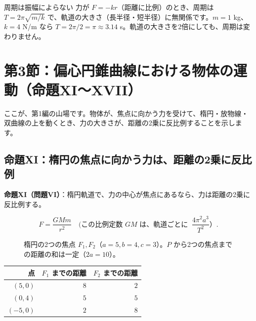 \documentclass[a4paper,11pt,openany]{ltjsbook}
\begin{document}
\begin{examplebox}{周期は振幅によらない}
力が $F=-kr$（距離に比例）のとき、周期は $T=2\pi\sqrt{m/k}$ で、軌道の大きさ（長半径・短半径）に無関係です。$m=1$ kg、$k=4$ N/m なら $T=2\pi/2=\pi\approx3.14$ s。軌道の大きさを2倍にしても、周期は変わりません。
\end{examplebox}

\section{第3節：偏心円錐曲線における物体の運動（命題XI〜XVII）}

ここが、第1編の山場です。物体が、焦点に向かう力を受けて、楕円・放物線・双曲線の上を動くとき、力の大きさが、距離の2乗に反比例することを示します。

\subsection{命題XI：楕円の焦点に向かう力は、距離の2乗に反比例}

\textbf{命題XI（問題VI）}：楕円軌道で、力の中心が焦点にあるなら、力は距離の2乗に反比例する。

\[
F=\frac{GMm}{r^2}\quad(\text{この比例定数 }GM\text{ は、軌道ごとに }\ \frac{4\pi^2a^3}{T^2}\text{）}.
\]

\begin{figure}[htbp]
\centering
{}
\caption{楕円の2つの焦点 $F_1,F_2$（$a=5,b=4,c=3$）。$P$ から2つの焦点までの距離の和は一定（$2a=10$）。}
\end{figure}

\begin{center}
\begin{tabular}{rrr}
\toprule
点 & $F_1$ までの距離 & $F_2$ までの距離\\
\midrule
$(5,0)$ & $8$ & $2$\\
$(0,4)$ & $5$ & $5$\\
$(-5,0)$ & $2$ & $8$\\
\bottomrule
\end{tabular}
\end{center}
\end{document}
